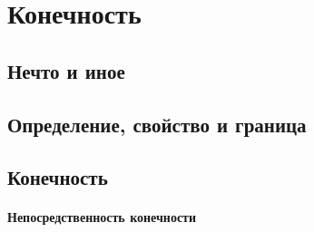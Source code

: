 \documentclass[12pt]{memoir}
\begin{document}


\section{Конечность}



\subsection{Нечто и иное}



\subsection{Определение, свойство и граница}



\subsection{Конечность}



\paragraph{Непосредственность конечности}




\printendnotes
\end{document}
